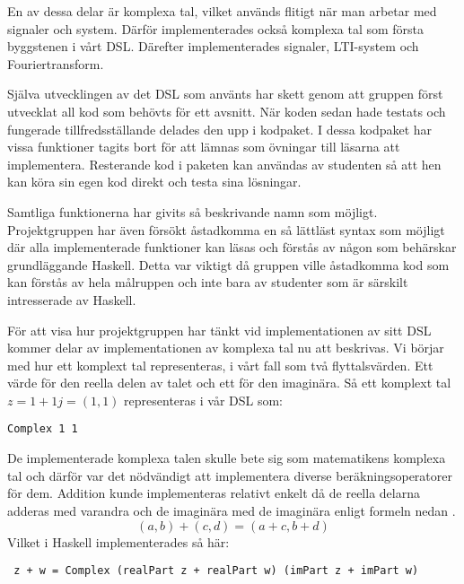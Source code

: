 \documentclass[]{article}
\begin{document}
En av dessa delar är komplexa tal, vilket används flitigt när man
arbetar med signaler och system. Därför implementerades också komplexa
tal som första byggstenen i vårt DSL. Därefter implementerades
signaler, LTI-system och Fouriertransform.

Själva utvecklingen av det DSL som använts har skett genom att gruppen
först utvecklat all kod som behövts för ett avsnitt. När koden sedan
hade testats och fungerade tillfredsställande delades den upp i
kodpaket. I dessa kodpaket har vissa funktioner tagits bort för att
lämnas som övningar till läsarna att implementera. Resterande kod i
paketen kan användas av studenten så att hen kan köra sin egen kod
direkt och testa sina lösningar.

Samtliga funktionerna har givits så beskrivande namn som
möjligt. Projektgruppen har även försökt åstadkomma en så lättläst
syntax som möjligt där alla implementerade funktioner kan läsas och
förstås av någon som behärskar grundläggande Haskell. Detta var
viktigt då gruppen ville åstadkomma kod som kan förstås av hela
målruppen och inte bara av studenter som är särskilt intresserade av
Haskell.


För att visa hur projektgruppen har tänkt vid implementationen av sitt
DSL kommer delar av implementationen av komplexa tal nu att
beskrivas. Vi börjar med hur ett komplext tal representeras, i vårt
fall som två flyttalsvärden. Ett värde för den reella delen av talet
och ett för den imaginära. Så ett komplext tal
\(z = 1 + 1j = (1,1) \) representeras i vår DSL som:

\begin{verbatim}
Complex 1 1
\end{verbatim}

De implementerade komplexa talen skulle bete sig som matematikens
komplexa tal och därför var det nödvändigt att implementera diverse
beräkningsoperatorer för dem. Addition kunde implementeras relativt
enkelt då de reella delarna adderas med varandra och de imaginära med
de imaginära enligt formeln nedan \cite{conway1978functions}.
\[(a, b) + (c, d) = (a + c, b + d)\]
Vilket i Haskell implementerades så här:
\begin{verbatim}
 z + w = Complex (realPart z + realPart w) (imPart z + imPart w)
\end{verbatim}
\end{document}

